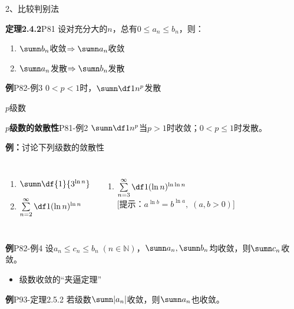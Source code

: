 \begin{frame}{2、比较判别法}
	\linespread{1.2}\pause
	\begin{block}{{\bf 定理2.4.2}\hfill P81}
		设对充分大的$n$，总有$0\leq a_n\leq b_n$，则：\pause
		\begin{enumerate}
		  \item $\sumn b_n$收敛$\Rightarrow\sumn a_n$收敛\pause
		  \item $\sumn a_n$发散$\Rightarrow\sumn b_n$发散\pause
		\end{enumerate}
	\end{block}
	\begin{exampleblock}{{\bf 例}\hfill P82-例3}
		$0<p<1$时，$\sumn\df 1{n^p}$发散
	\end{exampleblock}
\end{frame}

\begin{frame}{$p$级数}
	\linespread{1.2}
	\begin{alertblock}{{\bf $p$级数的敛散性}\hfill P81-例2}
		$\sumn\df 1{n^p}$当$p>1$时收敛；$0<p\leq 1$时发散。
	\end{alertblock}\pause 
	\begin{exampleblock}{{\bf 例：}讨论下列级数的敛散性}\pause 
		\begin{columns}
				\begin{enumerate}
				  \item $\sumn\df{1}{3^{\ln n}}$\pause 
				  \item $\sum\limits_{n=2}^{\infty}\df 1{(\ln n)^{\ln n}}$\pause 
				\end{enumerate}	
				\begin{enumerate}
				  \addtocounter{enumi}{2}
				  \item $\sum\limits_{n=3}^{\infty}\df 1{(\ln n)^{\ln\ln n}}$\\[10pt]
				  \pause \hspace{-1em}\alert{[提示：$a^{\ln b}=b^{\ln a},\;(a,b>0)$]}
				\end{enumerate}
		\end{columns}
		
	\end{exampleblock}
\end{frame}

\begin{frame}
	\linespread{1.2}
	\begin{alertblock}{{\bf 例}\hfill P82-例4}
		设$a_n\leq c_n\leq b_n\;(n\in\mathbb{N})$，$\sumn a_n,\sumn b_n$均收敛，则$\sumn
		c_n$收敛。
	\end{alertblock}\pause
	\begin{itemize}
	  \item 级数收敛的“夹逼定理”\pause
	\end{itemize}
	\begin{exampleblock}{{\bf 例}\hfill P93-定理2.5.2}
		若级数$\sumn|a_n|$收敛，则$\sumn a_n$也收敛。
	\end{exampleblock}
\end{frame}


